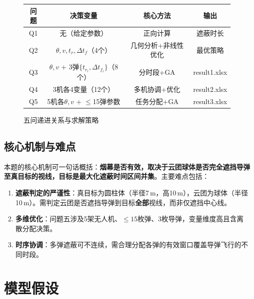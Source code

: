 \documentclass[a4paper]{ctexart}
\begin{document}
\begin{figure}[H]
\centering
\begin{minipage}{0.95\textwidth}
\centering
{}
\begin{tabular}{c|c|c|c}
\toprule
问题 & 决策变量 & 核心方法 & 输出 \\
\midrule
Q1 & 无（给定参数） & 正向计算 & 遮蔽时长 \\
Q2 & $\theta, v, t_r, \Delta t_f$（4个） & 几何分析+非线性优化 & 最优策略 \\
Q3 & $\theta, v$ + 3弹$\{t_{r_i}, \Delta t_{f_i}\}$（8个） & 分时段+GA & result1.xlsx \\
Q4 & 3机各4变量（12个） & 多机协调+优化 & result2.xlsx \\
Q5 & 5机各$\theta,v$ + $\leq$15弹参数 & 任务分配+GA & result3.xlsx \\
\bottomrule
\end{tabular}
\caption{五问递进关系与求解策略}
\label{fig:framework}
\end{minipage}
\end{figure}

\subsection{核心机制与难点}

本题的核心机制可一句话概括：\textbf{烟幕是否有效，取决于云团球体是否完全遮挡导弹至真目标的视线，目标是最大化遮蔽时间区间并集}。主要难点包括：

\begin{enumerate}[label=（\arabic*）]
  \item \textbf{遮蔽判定的严谨性}：真目标为圆柱体（半径7\,m，高10\,m），云团为球体（半径10\,m）。需判定云团是否遮挡导弹到目标\textbf{全部}视线，而非仅遮挡中心线。
  \item \textbf{多维优化}：问题五涉及5架无人机、$\leq 15$枚弹、3枚导弹，变量维度高且含离散分配决策。
  \item \textbf{时序协调}：多弹遮蔽可不连续，需合理分配各弹的有效窗口覆盖导弹飞行的不同时段。
\end{enumerate}

\section{模型假设}
\end{document}
